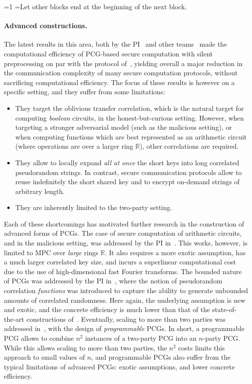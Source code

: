 \documentclass[oneside, a4paper, onecolumn, 11pt]{article}
\newcommand{\R}{\mathbb{R}}
\newcommand{\GNote}[1]{\textcolor{magenta}{ \textbf{Geoffroy:} #1 }}
\newcounter{alphasect}
\def\alphainsection{0}
\newenvironment{alphasection}{%
  \ifnum\alphainsection=1%
    \errhelp={Let other blocks end at the beginning of the next block.}
    \errmessage{Nested Alpha section not allowed}
  \fi%
  \setcounter{alphasect}{0}
  \def\alphainsection{1}
}{%
  \setcounter{alphasect}{0}
  \def\alphainsection{0}
}%
\begin{document}
\begin{alphasection}
\paragraph{Advanced constructions.} The latest results in this area, both by the PI~\cite{C:CouRinRag21,C:BCGIKRS22} and other teams~\cite{CCS:YWLZW20,SP:WYKW21} made the computational efficiency of PCG-based secure computation with silent preprocessing on par with the protocol of~\cite{C:IKNP03}, yielding overall a major reduction in the communication complexity of many secure computation protocols, without sacrificing computational efficiency. The focus of these results is however on a specific setting, and they suffer from some limitations:
\begin{itemize}
    \item They target the oblivious transfer correlation, which is the natural target for computing \emph{boolean} circuits, in the honest-but-curious setting. However, when targeting a stronger adversarial model (such as the malicious setting), or when computing functions which are best represented as an arithmetic circuit (where operations are over a larger ring $\R$), other correlations are required.
    \item They allow to locally expand \emph{all at once} the short keys into long correlated pseudorandom strings. In contrast, secure communication protocols allow to reuse indefinitely the short shared key and to encrypt on-demand strings of arbitrary length.
    \item They are inherently limited to the two-party setting.
\end{itemize}


Each of these shortcomings has motivated further research in the construction of advanced forms of PCGs. The case of secure computation of arithmetic circuits, and in the malicious setting, was addressed by the PI in~\cite{C:BCGIKS20}. This works, however, is limited to MPC over \emph{large} rings $\R$. It also requires a more exotic assumption, has a much larger correlated key size, and incurs a superlinear computational cost due to the use of high-dimensional fast Fourier transforms. The bounded nature of PCGs was addressed by the PI in~\cite{FOCS:BCGIKS20}, where the notion of pseudorandom correlation \emph{functions} was introduced to capture the ability to generate unbounded amounts of correlated randomness. Here again, the underlying assumption is new and exotic, and the concrete efficiency is much lower than that of the state-of-the-art constructions of~\cite{C:CouRinRag21,C:BCGIKRS22}. Eventually, scaling to more than two parties was addressed in~\cite{C:BCGIKS20,C:BCGIKRS22}, with the design of \emph{programmable} PCGs. In short, a programmable PCG allows to combine $n^2$ instances of a two-party PCG into an $n$-party PCG. While this allows scaling to more than two parties, the $n^2$ costs limits this approach to small values of $n$, and programmable PCGs also suffer from the typical limitations of advanced PCGs: exotic assumptions, and lower concrete efficiency.


\end{alphasection}
\end{document}
